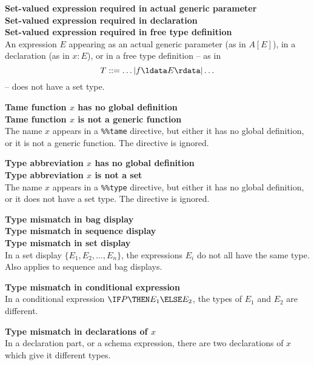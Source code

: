 {{{{{{\begin{trivlist}
\item[]
{\bf Set-valued expression required in actual generic parameter}\\
{\bf Set-valued expression required in declaration}\\
{\bf Set-valued expression required in free type definition}\\
        An expression $E$ appearing as an actual generic parameter (as
        in $A[E]$), in a declaration (as in $x: E$), or in a free type
        definition -- as in 
        \[ T ::= \ldots | f \ldata E \rdata | \ldots \]
        -- does not have a set type.

\item[]
{\bf Tame function $x$ has no global definition}\\
{\bf Tame function $x$ is not a generic function}\\
        The name $x$ appears in a \verb/%%tame/ directive, but
        either it has no global definition, or it is not a generic
        function.  The directive is ignored.

\item[]
{\bf Type abbreviation $x$ has no global definition}\\
{\bf Type abbreviation $x$ is not a set}\\
        The name $x$ appears in a \verb/%%type/ directive, but
        either it has no global definition, or it does not have a set
        type. The directive is ignored.

\item[]
{\bf Type mismatch in bag display}\\
{\bf Type mismatch in sequence display}\\
{\bf Type mismatch in set display}\\
        In a set display $\{E_1, E_2, \ldots, E_n\}$, the
        expressions $E_i$ do not all have the same type. Also applies
        to sequence and bag displays. 

\item[]{\bf Type mismatch in conditional expression}\\
        In a conditional expression $\IF P \THEN E_1 \ELSE E_2$, the
        types of $E_1$ and $E_2$ are different. 

\item[]{\bf Type mismatch in declarations of $x$}\\
        In a declaration part, or a schema expression, there are two
        declarations of $x$ which give it different types.
        

\end{trivlist}}}}}}}
